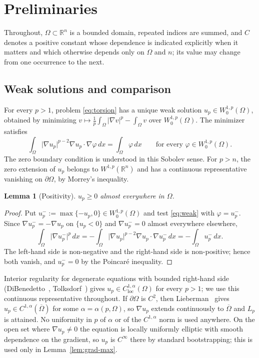 \documentclass[11pt]{article}
\newcommand{\R}{\mathbb R}
\newcommand{\abs}[1]{\lvert #1\rvert}
\newtheorem{lemma}[theorem]{Lemma}
\theoremstyle{definition}
\theoremstyle{remark}
\begin{document}
\section{Preliminaries}\label{sec:prelim}
Throughout, $\Omega\subset\R^n$ is a bounded domain, repeated indices are
summed, and $C$ denotes a positive constant whose dependence is indicated
explicitly when it matters and which otherwise depends only on $\Omega$ and
$n$; its value may change from one occurrence to the next.

\subsection{Weak solutions and comparison}
For every $p>1$, problem
\eqref{eq:torsion} has a unique weak solution $u_p\in W^{1,p}_0(\Omega)$,
obtained by minimizing
$v\mapsto\frac1p\int_\Omega\abs{\nabla v}^p-\int_\Omega v$ over
$W^{1,p}_0(\Omega)$. The minimizer satisfies 
\begin{equation}\label{eq:weak}
\int_\Omega\abs{\nabla u_p}^{p-2}\nabla u_p\cdot\nabla\varphi\,dx
=\int_\Omega\varphi\,dx
\qquad\text{for every }\varphi\in W^{1,p}_0(\Omega).
\end{equation}
The zero boundary condition is understood in this Sobolev sense. For $p>n$,
the zero extension of $u_p$ belongs to $W^{1,p}(\R^n)$ and has a continuous
representative vanishing on $\partial\Omega$, by Morrey's inequality.

\begin{lemma}[Positivity]\label{lem:positivity}
$u_p\ge0$ almost everywhere in $\Omega$.
\end{lemma}
\begin{proof}
Put $u_p^-:=\max\{-u_p,0\}\in W^{1,p}_0(\Omega)$ and test \eqref{eq:weak} with
$\varphi=u_p^-$. Since $\nabla u_p^-=-\nabla u_p$ on $\{u_p<0\}$ and
$\nabla u_p^-=0$ almost everywhere elsewhere,
\[
\int_\Omega\abs{\nabla u_p^-}^p\,dx
=-\int_\Omega\abs{\nabla u_p}^{p-2}\nabla u_p\cdot\nabla u_p^-\,dx
=-\int_\Omega u_p^-\,dx.
\]
The left-hand side is non-negative and the right-hand side is non-positive;
hence both vanish, and $u_p^-=0$ by the Poincar\'e inequality.
\end{proof}

Interior regularity for degenerate equations with bounded right-hand side
(DiBenedetto~\cite{DiB}, Tolksdorf~\cite{Tol}) gives
$u_p\in C^{1,\alpha}_{\mathrm{loc}}(\Omega)$ for every $p>1$; we use this
continuous representative throughout. If $\partial\Omega$ is $C^2$, then
Lieberman~\cite{Lib} gives $u_p\in C^{1,\alpha}(\overline\Omega)$ for some
$\alpha=\alpha(p,\Omega)$, so $\nabla u_p$ extends continuously to
$\overline\Omega$ and $L_p$ is attained. No uniformity in $p$ of $\alpha$ or of
the $C^{1,\alpha}$ norm is used anywhere. On the open set where
$\nabla u_p\ne0$ the equation is locally uniformly elliptic with smooth
dependence on the gradient, so $u_p$ is $C^\infty$ there by standard
bootstrapping; this is used only in Lemma~\ref{lem:grad-max}.
\end{document}
